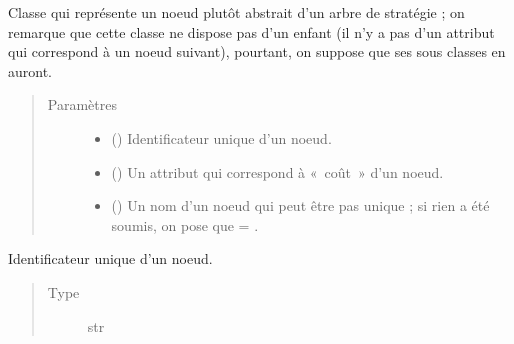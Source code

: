 \documentclass[letterpaper,10pt,french]{sphinxmanual}
\begin{document}
\begin{fulllineitems}
\label{\detokenize{index:StrategyTree.NodeST}}
Classe qui représente un noeud plutôt abstrait d’un arbre de stratégie ; on remarque que cette classe ne dispose pas
d’un enfant (il n’y a pas d’un attribut qui correspond à un noeud suivant), pourtant, on suppose que ses sous\sphinxhyphen{}
classes en auront.
\begin{quote}\begin{description}
\item[{Paramètres}] \leavevmode\begin{itemize}
\item {} 
 () \textendash{} Identificateur unique d’un noeud.

\item {} 
 () \textendash{} Un attribut qui correspond à « coût » d’un noeud.

\item {} 
 (\sphinxstyleliteralemphasis{\sphinxupquote{, }}) \textendash{} Un nom d’un noeud qui peut être pas unique ; si rien a été soumis, on pose que  = .

\end{itemize}

\end{description}\end{quote}

\begin{fulllineitems}
\label{\detokenize{index:StrategyTree.NodeST._id}}
Identificateur unique d’un noeud.
\begin{quote}\begin{description}
\item[{Type}] \leavevmode
str

\end{description}\end{quote}


\end{fulllineitems}
\end{fulllineitems}
\end{document}
